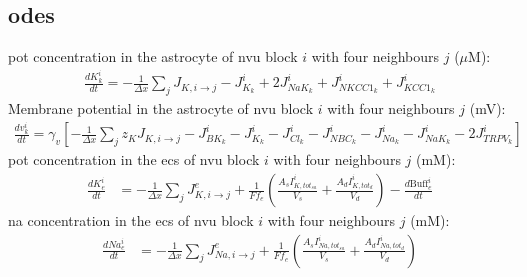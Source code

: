 \documentclass[11pt]{elsarticle}
\newcommand{\uM}{$\mu$M\xspace}
\newcommand{\na}{\gls{na}\xspace}
\newcommand{\pot}{\gls{pot}\xspace}
\begin{document}
\subsection{\Glspl{ode}}
%
\pot concentration in the astrocyte of \gls{nvu} block $i$ with four neighbours $j$ (\uM):
\begin{align}
\frac{d K_k^i}{dt} = - \frac{1}{\Delta x}\sum_j J_{K,i \to j} - J_{K_k}^i + 2 J_{NaK_{k}}^i + J_{NKCC1_{k}}^i +  J_{KCC1_{k}}^i
\end{align}
%
Membrane potential in the astrocyte of \gls{nvu} block $i$ with four neighbours $j$ (mV):
\begin{align}
\frac{d v_k^i}{dt} = \gamma_v \left[ -\frac{1}{\Delta x} \sum_j z_K J_{K,i \to j} -J_{BK_k}^i - J_{K_k}^i - J_{Cl_k}^i - J_{NBC_k}^i - J_{Na_k}^i - J_{NaK_k}^i - 2J_{TRPV_k}^i \right]
\end{align}
%
\pot concentration in the \gls{ecs} of \gls{nvu} block $i$ with four neighbours $j$ (mM):
\begin{align}
\frac{dK_{e}^i}{dt} &= -\frac{1}{\Delta x} \sum_j J^{e}_{K,i\to j} + \frac{1}{F f_e} \left( \frac{A_s I_{K,tot_{sa}}^i}{V_s} + \frac{A_d I_{K,tot_d}^i}{V_d} \right) - \frac{d \text{Buff}^i_e}{dt}
\end{align}
%
\na concentration in the \gls{ecs} of \gls{nvu} block $i$ with four neighbours $j$ (mM):
\begin{align}
\frac{d Na_e^i}{dt} &= -\frac{1}{\Delta x} \sum_j J^{e}_{Na,i\to j} + \frac{1}{F f_e} \left( \frac{A_s I_{Na,tot_{sa}}^i}{V_s} + \frac{A_d I_{Na,tot_d}^i}{V_d} \right)
\end{align}
%
\end{document}
